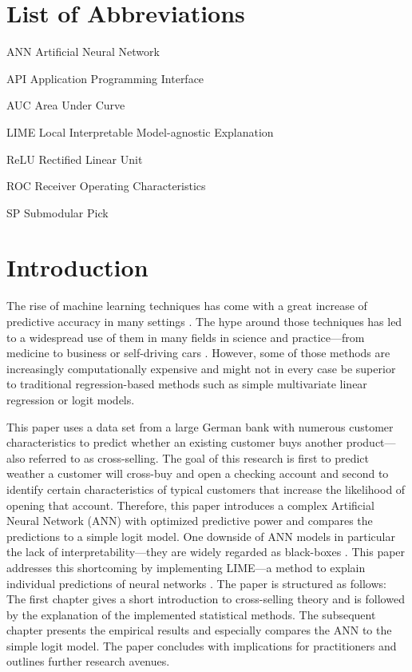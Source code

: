 \documentclass[12pt,a4paper]{article}
\begin{document}
\section*{List of Abbreviations}
 
\begin{abbrv}
 
\item[ANN]			Artificial Neural Network
\item[API]				Application Programming Interface
\item[AUC]			Area Under Curve
\item[LIME]			Local Interpretable Model-agnostic Explanation
\item[ReLU]			Rectified Linear Unit
\item[ROC]			Receiver Operating Characteristics
\item[SP]				Submodular Pick
 
\end{abbrv}
\newpage
\setcounter{page}{2}
\setlength{\baselineskip}{1.5\baselineskip}
\pagestyle{plain}


\section{Introduction}

The rise of machine learning techniques has come with a great increase
of predictive accuracy in many settings \citep{jordanMachineLearningTrends2015}. The hype around those techniques has led to a widespread use of them in many fields in science and practice---from medicine to business or self-driving cars \citep{chenMachineLearningPrediction2017}.
However, some of those methods are increasingly computationally expensive and might not in every case be superior to traditional regression-based methods such as simple multivariate linear regression or logit models.

This paper uses a data set from a large German bank with numerous customer characteristics to predict whether an existing customer buys another
product---also referred to as cross-selling.
The goal of this research is first to predict weather a customer will cross-buy and open a checking account and second to identify certain characteristics of typical customers that increase the likelihood of opening that account.
Therefore, this paper introduces a complex Artificial Neural Network (ANN) with optimized predictive power and compares the predictions to a simple logit model.
One downside of ANN models in particular the lack of interpretability---they are widely regarded as black-boxes \citep{benitezAreArtificialNeural1997, dayhoffArtificialNeuralNetworks2001}.
This paper addresses this shortcoming by implementing LIME---a method to explain individual predictions of neural networks \citep{ribeiroWhyShouldTrust2016a}.
The paper is structured as follows: The first chapter gives a short introduction to cross-selling theory and is followed by the explanation of the implemented statistical methods.
The subsequent chapter presents the empirical results and especially compares the ANN to the simple logit model.
The paper concludes with implications for practitioners and outlines further research avenues.
\end{document}
